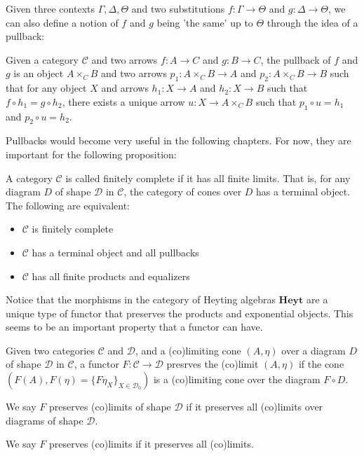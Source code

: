 Given three contexts $\Gamma,\Delta,\Theta$ and two substitutions $f:\Gamma\to\Theta$ 
and $g:\Delta\to\Theta$,
we can also define a notion of $f$ and $g$ being 'the same'
up to $\Theta$ through the idea of a pullback:
\begin{definition}[Pullback]
    Given a category $\mathcal{C}$ and two arrows $f:A\to C$ and $g:B\to C$,
    the pullback of $f$ and $g$ is an object $A\times_C B$
     and two arrows $p_1:A\times_C B\to A$ and $p_2:A\times_C B\to B$ such that
    for any object $X$ and arrows $h_1:X\to A$ and $h_2:X\to B$ such that $f\circ h_1=g\circ h_2$,
    there exists a unique arrow $u:X\to A\times_C B$ such that $p_1\circ u=h_1$ and $p_2\circ u=h_2$.
\end{definition}
Pullbacks would become very useful in the following chapters.
For now, they are important for the following proposition:
\begin{theorem}
    A category $\mathcal{C}$ is called finitely complete if it has all finite limits.
    That is, for any diagram $D$ of shape $\mathcal{D}$ in $\mathcal{C}$,
    the category of cones over $D$ has a terminal object.
    The following are equivalent:
    \begin{itemize}
        \item $\mathcal{C}$ is finitely complete
        \item $\mathcal{C}$ has a terminal object and all pullbacks
        \item $\mathcal{C}$ has all finite products and equalizers
    \end{itemize}
\end{theorem}

Notice that the morphisms in the category of Heyting algebras
$\mathbf{Heyt}$ are a unique type of functor that preserves 
the products and exponential objects.
This seems to be an important property that a functor can have.
\begin{definition}
    Given two categories $\mathcal{C}$ and $\mathcal{D}$,
    and a (co)limiting cone $(A,\eta)$ over a diagram $D$ of shape 
    $\mathcal{D}$ in $\mathcal{C}$,
    a functor $F:\mathcal{C}\to\mathcal{D}$ 
    presrves the (co)limit $(A,\eta)$ if 
    the cone $(F(A),F(\eta)=\{F\eta_X\}_{X\in\mathcal{D}_0})$ 
    is a (co)limiting cone over the diagram $F\circ D$.
    
    We say $F$ preserves (co)limits of shape $\mathcal{D}$ 
    if it preserves all (co)limits over diagrams of 
    shape $\mathcal{D}$.

    We say $F$ preserves (co)limits if it 
    preserves all (co)limits.
    
\end{definition}

